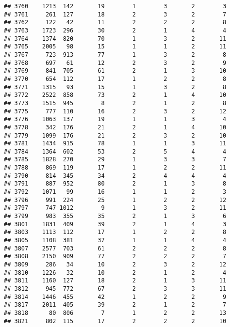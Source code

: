\documentclass[]{article}
\begin{document}
\begin{verbatim}
## 3760    1213  142       19        1        3       2        3
## 3761     261  127       18        2        3       2        7
## 3762     122   42       11        2        2       2        8
## 3763    1723  296       30        2        1       4        4
## 3764    1374  820       70        1        3       2       11
## 3765    2005   98       15        1        1       2       11
## 3767     723  913       77        1        3       2        8
## 3768     697   61       12        2        3       2        9
## 3769     841  705       61        2        1       3       10
## 3770     654  112       17        1        2       2        8
## 3771    1315   93       15        1        3       2        8
## 3772    2522  858       73        2        1       4       10
## 3773    1515  945        8        2        1       2        8
## 3775     777  110       16        2        3       2       12
## 3776    1063  137       19        1        1       3        4
## 3778     342  176       21        2        1       4       10
## 3779    1099  176       21        2        3       2       10
## 3781    1434  915       78        1        1       3       11
## 3784    1364  602       53        2        5       4        4
## 3785    1828  270       29        1        3       3        7
## 3788     869  119       17        1        2       2       11
## 3790     814  345       34        2        4       4        4
## 3791     887  952       80        2        1       3        8
## 3792    1071   99       16        1        1       2        3
## 3796     991  224       25        1        2       2       12
## 3797     747 1012        9        1        3       2       11
## 3799     983  355       35        2        1       3        6
## 3801    1831  409       39        2        1       4        3
## 3803    1113  112       17        1        2       2        8
## 3805    1108  381       37        1        1       4        4
## 3807    2577  703       61        2        2       2        8
## 3808    2150  909       77        2        2       2        7
## 3809     286   34       10        2        3       2       12
## 3810    1226   32       10        2        1       2        4
## 3811    1160  127       18        2        1       3       11
## 3812     945  772       67        2        3       3       11
## 3814    1446  455       42        1        2       2        9
## 3817    2011  405       39        2        1       2        7
## 3818      80  806        7        1        2       2       13
## 3821     802  115       17        2        2       2       10

\end{verbatim}
\end{document}
